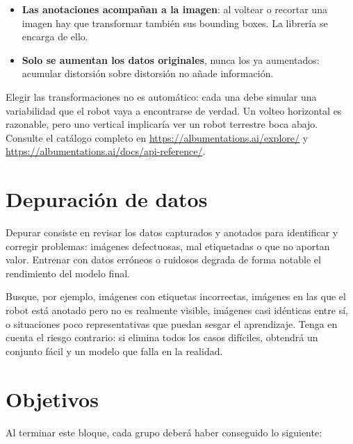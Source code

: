 \documentclass[12pt,a4paper]{article}
\begin{document}
\begin{itemize}
    \item \textbf{Las anotaciones acompañan a la imagen}: al voltear o recortar una imagen hay que transformar también sus bounding boxes. La librería se encarga de ello.
    \item \textbf{Solo se aumentan los datos originales}, nunca los ya aumentados: acumular distorsión sobre distorsión no añade información.
\end{itemize}

Elegir las transformaciones no es automático: cada una debe simular una variabilidad que el robot vaya a encontrarse de verdad. Un volteo horizontal es razonable, pero uno vertical implicaría ver un robot terrestre boca abajo. Consulte el catálogo completo en \url{https://albumentations.ai/explore/} y \url{https://albumentations.ai/docs/api-reference/}.


\section{Depuración de datos}

Depurar consiste en revisar los datos capturados y anotados para identificar y corregir problemas: imágenes defectuosas, mal etiquetadas o que no aportan valor. Entrenar con datos erróneos o ruidosos degrada de forma notable el rendimiento del modelo final.

Busque, por ejemplo, imágenes con etiquetas incorrectas, imágenes en las que el robot está anotado pero no es realmente visible, imágenes casi idénticas entre sí, o situaciones poco representativas que puedan sesgar el aprendizaje. Tenga en cuenta el riesgo contrario: si elimina todos los casos difíciles, obtendrá un conjunto fácil y un modelo que falla en la realidad.


\section{Objetivos}
\label{sec:objetivos}

Al terminar este bloque, cada grupo deberá haber conseguido lo siguiente:
\end{document}
